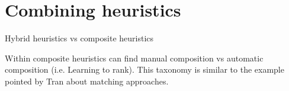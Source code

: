 \section{Combining heuristics}
Hybrid heuristics vs composite heuristics

Within composite heuristics can find manual composition vs automatic composition (i.e. Learning to rank). This taxonomy is similar to the 
example pointed by Tran about matching approaches.